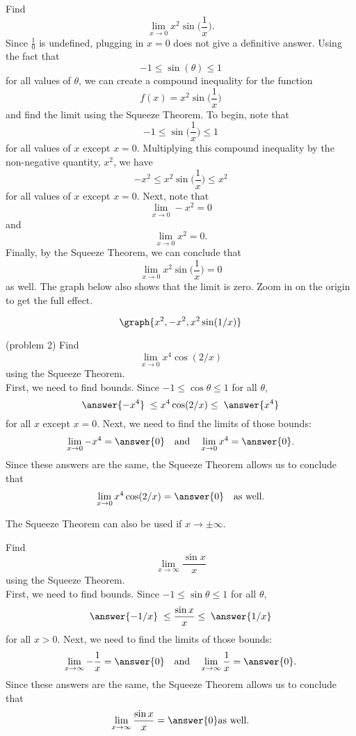 \documentclass{ximera}
\begin{document}
\begin{example}[example 2]
Find
\[
\lim_{x\to 0} x^2 \sin\Big(\frac{1}{x}\Big).
\]
Since $\frac{1}{0}$ is undefined, plugging in $x=0$
does not give a definitive answer.
Using the fact that 
\[
-1 \leq \sin(\theta) \leq 1
\]
for all values of $\theta$, we can create a compound inequality for
the function
\[
f(x) = x^2 \sin\Big(\frac{1}{x}\Big)
\]
and find the limit using the Squeeze Theorem.
To begin, note that
\[
-1 \leq \sin\Big(\frac{1}{x}\Big) \leq 1
\]
for all values of $x$ except $x=0$.
Multiplying this compound inequality by the non-negative quantity, $x^2$,
we have
\[
-x^2 \leq x^2\sin\Big(\frac{1}{x}\Big) \leq x^2
\]
for all values of $x$ except $x=0$.
Next, note that
\[
\lim_{x\to 0} -x^2 = 0
\]
and
\[
\lim_{x\to 0} x^2 = 0.
\]
Finally, by the Squeeze Theorem, we can conclude that
\[
\lim_{x\to 0} x^2\sin\Big(\frac{1}{x}\Big) = 0
\]
as well. The graph below also shows that the limit is zero.
Zoom in on the origin to get the full effect.

\[
\graph{x^2, -x^2, x^2 \sin(1/x)}
\]

\end{example}

\begin{problem}(problem 2)
Find
\[
\lim_{x \to 0} x^4 \cos(2/x)
\]
using the Squeeze Theorem.\\
First, we need to find bounds. Since $-1 \leq \cos \theta \leq 1$ for all $\theta$, 
\[
\answer{-x^4} \; \leq x^4\cos(2/x) \leq \; \answer{x^4}
\]
for all $x$ except $x=0$.
Next, we need to find the limits of those bounds:
\[
\lim_{x \to 0}  - x^4 = \answer{0} \quad \text{and} \quad  \lim_{x \to 0} x^4 = \answer{0}.
\]
Since these answers are the same, the Squeeze Theorem allows us to conclude that 
\[
\lim_{x \to 0} x^4\cos(2/x) = \answer{0} \quad \text{as well}.
\]

\end{problem}

The Squeeze Theorem can also be used if $x \to \pm \infty$.

\begin{example}[example 3]
Find
\[
\lim_{x \to \infty} \frac{\sin x}{x}
\]
using the Squeeze Theorem.\\
First, we need to find bounds. Since $-1 \leq \sin \theta \leq 1$ for all $\theta$, 
\[
\answer{-1/x} \; \leq \frac{\sin x}{x} \leq \;  \answer{1/x}
\]
for all $x>0$.
Next, we need to find the limits of those bounds:
\[
\lim_{x \to \infty}  -\frac{1}{x} = \answer{0} \quad \text{and} \quad \lim_{x \to \infty} \frac{1}{x} = \answer{0}.
\]
Since these answers are the same, the Squeeze Theorem allows us to conclude that 
\[
\lim_{x \to \infty} \frac{\sin x}{x} = \answer{0} \text{as well}.
\]

\end{example}
\end{document}
